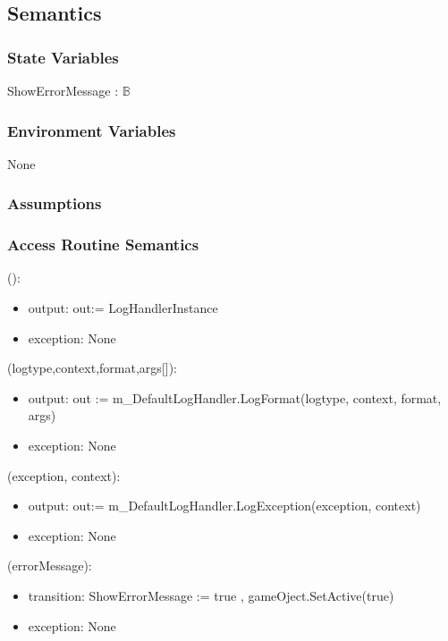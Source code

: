 \documentclass[12pt, titlepage]{article}
\begin{document}
\subsection{Semantics}

\subsubsection{State Variables}

ShowErrorMessage : $\mathds{B}$

\subsubsection{Environment Variables}

None

\subsubsection{Assumptions}

\subsubsection{Access Routine Semantics}

():
\begin{itemize}
\item output: out:= LogHandlerInstance
\item exception: None
\end{itemize}

(logtype,context,format,args[]):
\begin{itemize}
\item output: out := m\_DefaultLogHandler.LogFormat(logtype, context, format, args)
\item exception: None
\end{itemize}

(exception, context):
\begin{itemize}
\item output: out:= m\_DefaultLogHandler.LogException(exception, context)
\item exception: None
\end{itemize}

(errorMessage):
\begin{itemize}
\item transition: ShowErrorMessage := true , gameOject.SetActive(true)
\item exception: None
\end{itemize}
\end{document}
